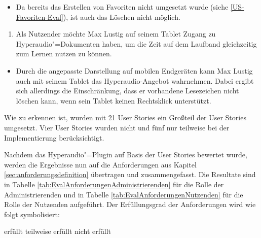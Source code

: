 \vspace{-0.1cm}
\begin{itemize}
\item[\XSolidBrush]
Da bereits das Erstellen von Favoriten nicht umgesetzt wurde (siehe \ref{US-Favoriten-Eval}), ist auch das Löschen nicht möglich.
\end{itemize}
\vspace{0.25cm}
\begin{enumerate}[resume*]
\item \label{US-Zeit-Mobil-Eval} Als Nutzender möchte Max Lustig auf seinem Tablet Zugang zu Hyperaudio"=Dokumenten haben, um die Zeit auf dem Laufband gleichzeitig zum Lernen nutzen zu können.
\end{enumerate}
\vspace{-0.1cm}
\begin{itemize}
\item[\Asterisk]
Durch die angepasste Darstellung auf mobilen Endgeräten kann Max Lustig auch mit seinem Tablet das Hyperaudio-Angebot wahrnehmen. Dabei ergibt sich allerdings die Einschränkung, dass er vorhandene Lesezeichen nicht löschen kann, wenn sein Tablet keinen Rechtsklick unterstützt.
\end{itemize}

Wie zu erkennen ist, wurden mit 21 User Stories ein Großteil der User Stories umgesetzt. Vier User Stories wurden nicht und fünf nur teilweise bei der Implementierung berücksichtigt.

Nachdem das Hyperaudio"=Plugin auf Basis der User Stories bewertet wurde, werden die Ergebnisse nun auf die Anforderungen aus Kapitel \ref{sec:anforderungsdefinition} übertragen und zusammengefasst. Die Resultate sind in Tabelle \ref{tab:EvalAnforderungenAdministrierenden} für die Rolle der Administrierenden und in Tabelle \ref{tab:EvalAnforderungenNutzenden} für die Rolle der Nutzenden aufgeführt. Der Erfüllungsgrad der Anforderungen wird wie folgt symbolisiert:

\begin{center}
\Checkmark  \nobreakspace\nobreakspace erfüllt \qquad \Asterisk \nobreakspace\nobreakspace teilweise erfüllt \qquad \XSolidBrush \nobreakspace\nobreakspace nicht erfüllt\\
\end{center}

